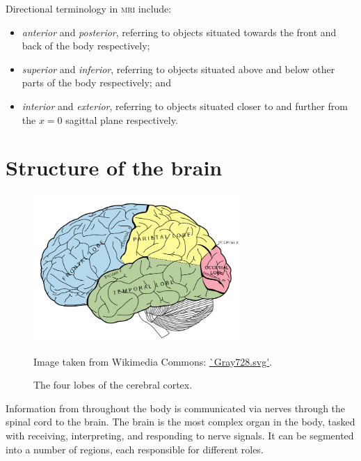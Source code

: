 Directional terminology in \textsc{mri} include:
\begin{itemize}
	\item \textit{anterior} and \textit{posterior}, referring to objects situated towards the front and back of the body respectively;
	\item \textit{superior} and \textit{inferior}, referring to objects situated above and below other parts of the body respectively; and
	\item \textit{interior} and \textit{exterior}, referring to objects situated closer to and further from the $x=0$ sagittal plane respectively.
\end{itemize}

\section{Structure of the brain}\label{svd-brain}

\begin{figure}[ht]
	\centering
	\includegraphics[width=0.7\textwidth]{Images/2_Lobes_of_the_brain_NL.png}
	\caption{\small{The four lobes of the cerebral cortex.}}
	\small Image taken from Wikimedia Commons: \url{`Gray728.svg'}.
	\label{svd-cerebrumfig}
\end{figure}

Information from throughout the body is communicated via nerves through the spinal cord to the brain. The brain is the most complex organ in the body, tasked with receiving, interpreting, and responding to nerve signals. It can be segmented into a number of regions, each responsible for different roles.

